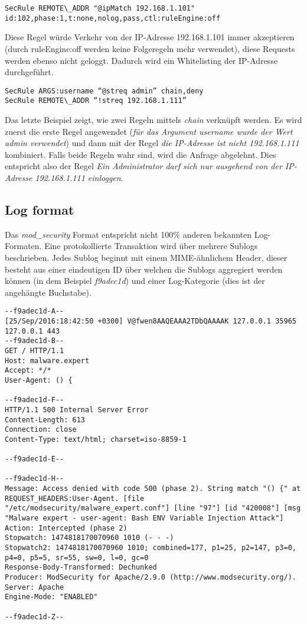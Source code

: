 \begin{verbatim}
SecRule REMOTE\_ADDR "@ipMatch 192.168.1.101" id:102,phase:1,t:none,nolog,pass,ctl:ruleEngine:off
\end{verbatim}

Diese Regel würde Verkehr von der IP-Adresse 192.168.1.101 immer akzeptieren (durch ruleEngine:off werden keine Folgeregeln mehr verwendet), diese Requests werden ebenso nicht geloggt. Dadurch wird ein Whitelisting der IP-Adresse durchgeführt.

\begin{verbatim}
SecRule ARGS:username “@streq admin” chain,deny
SecRule REMOTE\_ADDR “!streq 192.168.1.111”
\end{verbatim}

Das letzte Beispiel zeigt, wie zwei Regeln mittels \textit{chain} verknüpft werden. Es wird zuerst die erste Regel angewendet (\textit{für das Argument username wurde der Wert admin verwendet}) und dann mit der Regel \textit{die IP-Adresse ist nicht 192.168.1.111} kombiniert. Falls beide Regeln wahr sind, wird die Anfrage abgelehnt. Dies entspricht also der Regel \textit{Ein Administrator darf sich nur ausgehend von der IP-Adresse 192.168.1.111 einloggen}.

\subsection{Log format}

Das \textit{mod\_security} Format entspricht nicht 100\% anderen bekannten Log-Formaten. Eine protokollierte Transaktion wird über mehrere Sublogs beschrieben. Jedes Sublog beginnt mit einem MIME-ähnlichem Header, dieser besteht aus einer eindeutigen ID über welchen die Sublogs aggregiert werden können (in dem Beispiel \textit{f9adec1d}) und einer Log-Kategorie (dies ist der angehängte Buchstabe).

\begin{verbatim}
--f9adec1d-A--
[25/Sep/2016:18:42:50 +0300] V@fwen8AAQEAAA2TDbQAAAAK 127.0.0.1 35965 127.0.0.1 443
--f9adec1d-B--
GET / HTTP/1.1
Host: malware.expert
Accept: */*
User-Agent: () {

--f9adec1d-F--
HTTP/1.1 500 Internal Server Error
Content-Length: 613
Connection: close
Content-Type: text/html; charset=iso-8859-1

--f9adec1d-E--

--f9adec1d-H--
Message: Access denied with code 500 (phase 2). String match "() {" at REQUEST_HEADERS:User-Agent. [file "/etc/modsecurity/malware_expert.conf"] [line "97"] [id "420008"] [msg "Malware expert - user-agent: Bash ENV Variable Injection Attack"]
Action: Intercepted (phase 2)
Stopwatch: 1474818170070960 1010 (- - -)
Stopwatch2: 1474818170070960 1010; combined=177, p1=25, p2=147, p3=0, p4=0, p5=5, sr=55, sw=0, l=0, gc=0
Response-Body-Transformed: Dechunked
Producer: ModSecurity for Apache/2.9.0 (http://www.modsecurity.org/).
Server: Apache
Engine-Mode: "ENABLED"

--f9adec1d-Z--
\end{verbatim}

